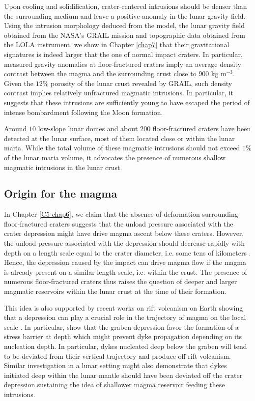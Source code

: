 Upon cooling and solidification,  crater-centered intrusions should be
denser than the surrounding medium and leave a positive anomaly in the
lunar gravity field.  Using the  intrusion morphology deduced from the
model, the lunar gravity field  obtained from the NASA’s GRAIL mission
and topographic  data obtained  from the LOLA  instrument, we  show in
Chapter  \ref{chap7} that  their  gravitational  signatures is  indeed
larger that the one of  normal impact craters. In particular, measured
gravity anomalies at floor-fractured  craters imply an average density
contrast between the magma and the surrounding crust close to $900$ kg
m$^{-3}$. Given  the $12\%$  porosity of the  lunar crust  revealed by
GRAIL, such  density contrast implies relatively  unfractured magmatic
intrusions.   In particular,  it  suggests that  these intrusions  are
sufficiently young to  have escaped the period  of intense bombardment
following the Moon formation.

Around  $10$ low-slope  lunar  domes and  about $200$  floor-fractured
craters have been detected at the  lunar surface, most of them located
close  or within  the lunar  maria. While  the total  volume of  these
magmatic intrusions should not exceed $1\%$ of the lunar maria volume,
it advocates the  presence of numerous shallow  magmatic intrusions in
the lunar crust.

\subsection{Origin for the magma}
\label{sec:crust-magm-intr}

In Chapter  \ref{C5-chap6}, we claim  that the absence  of deformation
surrounding floor-fractured craters suggests  that the unload pressure
associated with  the crater depression  might have drive  magma ascent
below these craters. However, the  unload pressure associated with the
depression should decrease rapidly with  depth on a length scale equal
to   the   crater   diameter,    i.e.    some   tens   of   kilometers
\citep{Pinel:2000wa}. Hence,  the depression caused by  the impact can
drive magma flow  if the magma is already present  on a similar length
scale, i.e. within the crust. The presence of numerous floor-fractured
craters  thus  raises  the  question of  deeper  and  larger  magmatic
reservoirs within the lunar crust at the time of their formation.

This idea is also supported by recent works on rift volcanism on Earth
showing that a depression can play a crucial role in the trajectory of
magma  on the  local scale  \citep{Maccaferri:2014ft}. In  particular,
\citet{Maccaferri:2014ft} show  that the  graben depression  favor the
formation  of a  stress  barrier  at depth  which  might prevent  dyke
propagation depending  on its  nucleation depth. In  particular, dykes
nucleated deep  below the graben will  tend to be deviated  from their
vertical   trajectory  and   produce   off-rift  volcanism.    Similar
investigation in  a lunar  setting might  also demonstrate  that dykes
initiated deep within  the lunar mantle should have  been deviated off
the crater depression sustaining the idea of shallower magma reservoir
feeding these intrusions.

